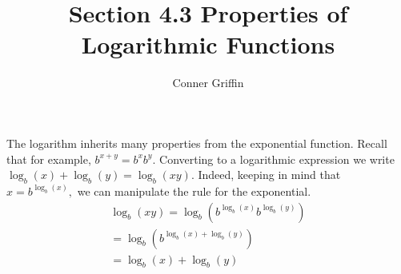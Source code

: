 \documentclass{ximera}
\title{Section 4.3 Properties of Logarithmic Functions}
\author{Conner Griffin}
\begin{document}
\begin{abstract}
    
\end{abstract}
\maketitle

The logarithm inherits many properties from the exponential function. Recall that for example, \(b^{x+y} = b^xb^y.\) Converting to a logarithmic expression we write \(\log_b(x)+\log_b(y) = \log_b(xy).\) Indeed, keeping in mind that \(x = b^{\log_b\left(x\right)},\) we can manipulate the rule for the exponential.
\begin{gather*}
    \log_b\left(xy\right) = \log_b\left(b^{\log_b\left(x\right)}b^{\log_b\left(y\right)}\right) \\
    =\log_b\left(b^{\log_b\left(x\right)+\log_b\left(y\right)}\right) \\
    =\log_b(x) + \log_b(y)
\end{gather*}



\end{document}
